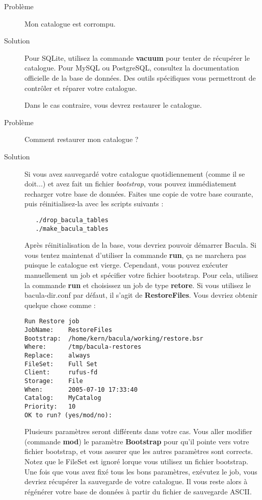 \begin{description}
\item[Probl\`eme]
   Mon catalogue est corrompu.
\item[Solution]
   Pour SQLite, utilisez la commande {\bf vacuum} pour tenter de r\'ecup\'erer 
   le catalogue. Pour MySQL ou PostgreSQL, consultez la documentation 
   officielle de la base de donn\'ees. Des outils sp\'ecifiques vous permettront 
   de contr\^oler et r\'eparer votre catalogue.

   Dans le cas contraire, vous devrez restaurer le catalogue.
\item[Probl\`eme]
   Comment restaurer mon catalogue ?
\item[Solution]
   Si vous avez sauvegard\'e votre catalogue quotidiennement (comme il se doit...) 
   et avez fait un fichier {\it bootstrap}, vous pouvez imm\'ediatement 
   recharger votre base de donn\'ees. Faites une copie de votre base courante, 
   puis r\'einitialisez-la avec les scripts suivants :
\begin{verbatim}
   ./drop_bacula_tables
   ./make_bacula_tables
\end{verbatim}
   Apr\`es r\'einitialisation de la base, vous devriez pouvoir d\'emarrer Bacula.
   Si vous tentez maintenat d'utiliser la commande {\bf run}, \c{c}a ne 
   marchera pas puisque le catalogue est vierge. Cependant, vous pouvez 
   ex\'ecuter manuellement un job et sp\'ecifier votre fichier bootstrap.
   Pour cela, utilisez la commande {\bf run} et choisissez un job de type 
   {\bf retore}. Si vous utilisez le bacula-dir.conf par d\'efaut, il s'agit 
   de {\bf RestoreFiles}. Vous devriez obtenir quelque chose comme :

\footnotesize
\begin{verbatim}
Run Restore job
JobName:    RestoreFiles
Bootstrap:  /home/kern/bacula/working/restore.bsr
Where:      /tmp/bacula-restores
Replace:    always
FileSet:    Full Set
Client:     rufus-fd
Storage:    File
When:       2005-07-10 17:33:40
Catalog:    MyCatalog
Priority:   10
OK to run? (yes/mod/no): 
\end{verbatim}
\normalsize
   Plusieurs param\`etres seront diff\'erents dans votre cas. Vous aller modifier 
   (commande {\bf mod}) le param\`etre {\bf Bootstrap} pour qu'il pointe 
   vers votre fichier bootstrap, et vous assurer que les autres param\`etres 
   sont corrects. Notez que le FileSet est ignor\'e lorque vous utilisez un 
   fichier bootstrap. Une fois que vous avez fix\'e tous les bons param\`etres, 
   ex\'evutez le job, vous devriez r\'ecup\'erer la sauvegarde de votre catalogue. 
   Il vous reste alors \`a r\'eg\'en\'erer votre base de donn\'ees \`a partir du 
   fichier de sauvegarde ASCII.


\end{description}
